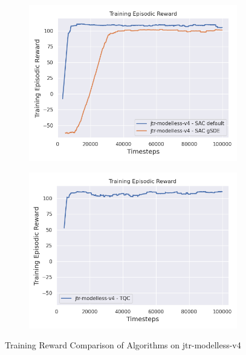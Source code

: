\documentclass[12pt,twoside]{report}
\begin{document}
\begin{figure}[h]
    \centering
    \begin{subfigure}[b]{0.48\textwidth}
        \centering
        \includegraphics[width=\textwidth]{figures/rl-reward-plots/modelless-v4-sac.png}
    \end{subfigure}
    \begin{subfigure}[b]{0.48\textwidth}
        \centering
        \includegraphics[width=\textwidth]{figures/rl-reward-plots/modelless-v4-tqc.png}
    \end{subfigure}
    \caption{Training Reward Comparison of Algorithms on jtr-modelless-v4}
    \label{fig:rl-comparison}
\end{figure}
\end{document}
